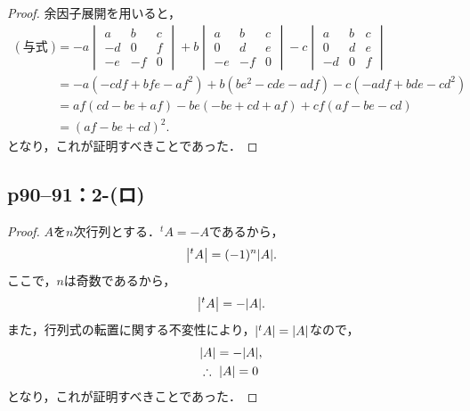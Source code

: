 \documentclass[a4paper,10pt,fleqn]{ltjsarticle}
\begin{document}
\begin{tleftbar}
  \begin{proof}
    余因子展開を用いると，
    \begin{align*}
      (\text{与式}) & = -a \begin{vmatrix} a & b & c \\ -d & 0 &f \\ -e & -f & 0 \end{vmatrix} +b \begin{vmatrix} a & b & c \\ 0 & d & e \\ -e & -f & 0 \end{vmatrix} -c \begin{vmatrix} a & b & c \\ 0 & d & e \\ -d & 0 & f \end{vmatrix} \\
                  & = -a (-cdf +bfe-af^2)+b(be^2-cde-adf)-c(-adf+bde-cd^2)                                                                                                                                                                \\
                  & = af (cd-be+af) -be(-be+cd+af) +cf(af-be-cd)                                                                                                                                                                          \\
                  & = (af-be+cd)^2.
    \end{align*}
    となり，これが証明すべきことであった．
  \end{proof}
\end{tleftbar}

\subsection*{p90--91：2-(ロ)}

\begin{tleftbar}
  \begin{proof}
    $A$を$n$次行列とする．${}^t A = -A$であるから，
    \[
      \abs{{}^t A}=(-1)^n\abs{A}.
    \]
    ここで，$n$は奇数であるから，
    \[
      \abs{{}^t A}=-\abs{A}.
    \]
    また，行列式の転置に関する不変性により，$\abs{{}^t A}=\abs{A}$なので，
    \begin{align*}
       & \abs{A}=-\abs{A} ,     \\
       & \therefore ~ \abs{A}=0
    \end{align*}
    となり，これが証明すべきことであった．
  \end{proof}
\end{tleftbar}
\end{document}
